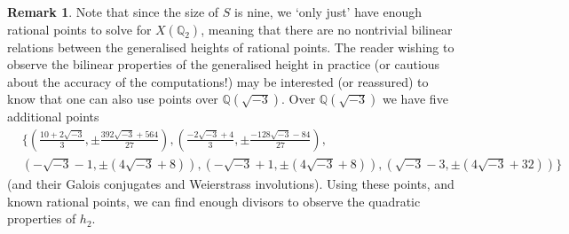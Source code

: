 \documentclass[11pt]{amsart}
\def\Q{\mathbb Q}
\theoremstyle{plain}
\theoremstyle{definition}
\newtheorem{remark}{Remark}
\DeclareMathOperator{\Gal}{Gal}
\newcommand{\dR}{\mathrm{dR}}
\newcommand{\Div}{\mathrm{Div}}
\newcommand{\Sym}{\mathrm{Sym}}
\newcommand{\Jac}{\mathrm{Jac}}
\newcommand{\Res}{\mathrm{Res}}
\newcommand{\Ker}{\mathrm{Ker}}
\begin{document}
%

\begin{remark}
Note that since the size of $S$ is nine, we `only just' have enough rational points to solve for $X(\Q _2 )$, meaning that there are no nontrivial bilinear relations between the generalised heights of rational points. The reader wishing to observe the bilinear properties of the generalised height in practice (or cautious about the accuracy of the computations!) may be interested (or reassured) to know that one can also use points over $\Q (\sqrt{-3})$. Over $\Q (\sqrt{-3})$ we have five additional points
\begin{align*}
& \{(\frac{10+2\sqrt{-3}}{3},\pm \frac{392\sqrt{-3} + 564}{27}), (\frac{-2\sqrt{-3} + 4}{3} ,\pm \frac{-128\sqrt{-3} - 84}{27}), \\
 & (-\sqrt{-3} - 1,\pm (4\sqrt{-3} + 8)),(-\sqrt{-3} + 1,\pm (4\sqrt{-3} + 8)),  (\sqrt{-3} - 3,\pm (4\sqrt{-3} + 32))\}
\end{align*}
(and their Galois conjugates and Weierstrass involutions). Using these points, and known rational points, we can find enough divisors to observe the quadratic properties of $h_2 $.
\end{remark}



\end{document}
